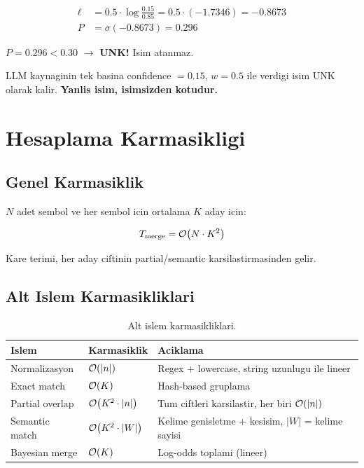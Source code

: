 \begin{align}
\ell &= 0.5 \cdot \log\frac{0.15}{0.85} = 0.5 \cdot (-1.7346) = -0.8673 \\
P &= \sigma(-0.8673) = 0.296
\end{align}

$P = 0.296 < 0.30$ $\to$ \textbf{UNK!} Isim atanmaz.

\begin{uyari}
LLM kaynaginin tek basina confidence $= 0.15$, $w = 0.5$ ile verdigi isim UNK olarak kalir. \textbf{Yanlis isim, isimsizden kotudur.}
\end{uyari}


\section{Hesaplama Karmasikligi}
\label{sec:complexity}

\subsection{Genel Karmasiklik}

$N$ adet sembol ve her sembol icin ortalama $K$ aday icin:

\begin{equation}
T_{\text{merge}} = \mathcal{O}\!\left(N \cdot K^2\right)
\end{equation}

Kare terimi, her aday ciftinin partial/semantic karsilastirmasinden gelir.

\subsection{Alt Islem Karmasikliklari}

\begin{table}[h]
\centering
\small
\begin{tabular}{lll}
\toprule
\textbf{\color{sectioncyan}Islem} & \textbf{\color{sectioncyan}Karmasiklik} & \textbf{\color{sectioncyan}Aciklama} \\
\midrule
Normalizasyon & $\mathcal{O}\!\left(|n|\right)$ & Regex + lowercase, string uzunlugu ile lineer \\
Exact match & $\mathcal{O}\!\left(K\right)$ & Hash-based gruplama \\
Partial overlap & $\mathcal{O}\!\left(K^2 \cdot |n|\right)$ & Tum ciftleri karsilastir, her biri $\mathcal{O}\!\left(|n|\right)$ \\
Semantic match & $\mathcal{O}\!\left(K^2 \cdot |W|\right)$ & Kelime genisletme + kesisim, $|W|$ = kelime sayisi \\
Bayesian merge & $\mathcal{O}\!\left(K\right)$ & Log-odds toplami (lineer) \\
\bottomrule
\end{tabular}
\caption{Alt islem karmasikliklari.}
\label{tab:complexity}
\end{table}

